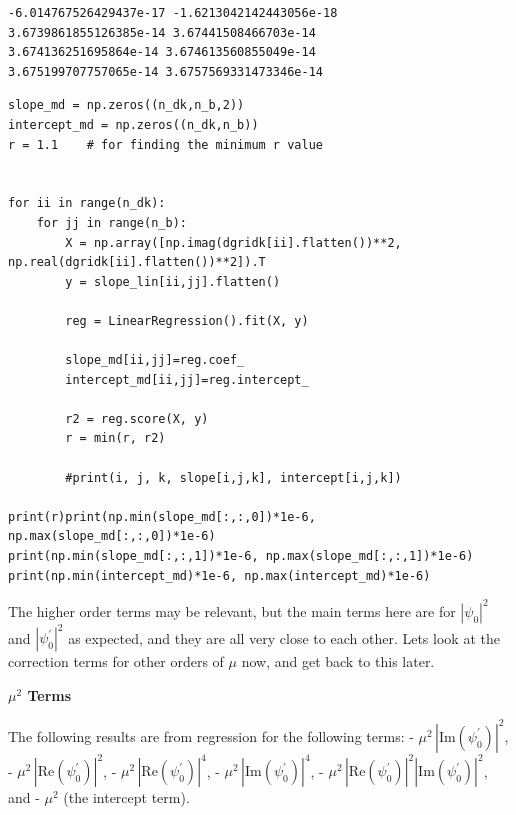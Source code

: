 \documentclass[11pt]{article}
\makeatletter
\newcommand{\boxspacing}{\kern\kvtcb@left@rule\kern\kvtcb@boxsep}
\newcommand{\prompt}[4]{
        {\ttfamily\llap{{\color{#2}[#3]:\hspace{3pt}#4}}\vspace{-\baselineskip}}
    }
\makeatother
\begin{document}
    \begin{Verbatim}[commandchars=\\\{\}]
-6.014767526429437e-17 -1.6213042142443056e-18
3.6739861855126385e-14 3.67441508466703e-14
3.674136251695864e-14 3.674613560855049e-14
3.675199707757065e-14 3.6757569331473346e-14
    \end{Verbatim}
    \begin{tcolorbox}[breakable, size=fbox, boxrule=1pt, pad at break*=1mm,colback=cellbackground, colframe=cellborder]
\prompt{In}{incolor}{41}{\boxspacing}
\begin{Verbatim}[commandchars=\\\{\}]
slope_md = np.zeros((n_dk,n_b,2))
intercept_md = np.zeros((n_dk,n_b))
r = 1.1    # for finding the minimum r value


for ii in range(n_dk):
    for jj in range(n_b):
        X = np.array([np.imag(dgridk[ii].flatten())**2, np.real(dgridk[ii].flatten())**2]).T
        y = slope_lin[ii,jj].flatten()

        reg = LinearRegression().fit(X, y)

        slope_md[ii,jj]=reg.coef_
        intercept_md[ii,jj]=reg.intercept_

        r2 = reg.score(X, y)
        r = min(r, r2)

        #print(i, j, k, slope[i,j,k], intercept[i,j,k])

print(r)print(np.min(slope_md[:,:,0])*1e-6, np.max(slope_md[:,:,0])*1e-6)
print(np.min(slope_md[:,:,1])*1e-6, np.max(slope_md[:,:,1])*1e-6)
print(np.min(intercept_md)*1e-6, np.max(intercept_md)*1e-6)
\end{Verbatim}
\end{tcolorbox}
    The higher order terms may be relevant, but the main terms here are for
\(|\psi_0|^2\) and \(|\psi^\prime_0|^2\) as expected, and they are all
very close to each other. Lets look at the correction terms for other
orders of \(\mu\) now, and get back to this later.

    \textbf{\(\mu^2\) Terms}

    The following results are from regression for the following terms: -
\(\mu^2 \, |\mathrm{Im} (\psi^\prime_0)|^2\), -
\(\mu^2 \, |\mathrm{Re} (\psi^\prime_0)|^2\), -
\(\mu^2 \,|\mathrm{Re} (\psi^\prime_0)|^4\), -
\(\mu^2 \, |\mathrm{Im} (\psi^\prime_0)|^4\), -
\(\mu^2 \,|\mathrm{Re} (\psi^\prime_0)|^2|\mathrm{Im} (\psi^\prime_0)|^2\),
and - \(\mu^2\) (the intercept term).
\end{document}
